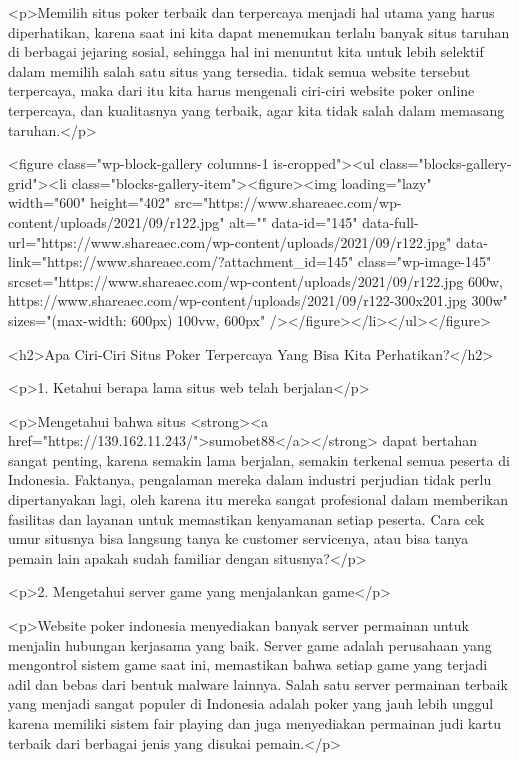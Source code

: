 <p>Memilih situs poker terbaik dan terpercaya menjadi hal utama yang harus diperhatikan, karena saat ini kita dapat menemukan terlalu banyak situs taruhan di berbagai jejaring sosial, sehingga hal ini menuntut kita untuk lebih selektif dalam memilih salah satu situs yang tersedia. tidak semua website tersebut terpercaya, maka dari itu kita harus mengenali ciri-ciri website poker online terpercaya, dan kualitasnya yang terbaik, agar kita tidak salah dalam memasang taruhan.</p>



<figure class="wp-block-gallery columns-1 is-cropped"><ul class="blocks-gallery-grid"><li class="blocks-gallery-item"><figure><img loading="lazy" width="600" height="402" src="https://www.shareaec.com/wp-content/uploads/2021/09/r122.jpg" alt="" data-id="145" data-full-url="https://www.shareaec.com/wp-content/uploads/2021/09/r122.jpg" data-link="https://www.shareaec.com/?attachment_id=145" class="wp-image-145" srcset="https://www.shareaec.com/wp-content/uploads/2021/09/r122.jpg 600w, https://www.shareaec.com/wp-content/uploads/2021/09/r122-300x201.jpg 300w" sizes="(max-width: 600px) 100vw, 600px" /></figure></li></ul></figure>



<h2>Apa Ciri-Ciri Situs Poker Terpercaya Yang Bisa Kita Perhatikan?</h2>



<p>1. Ketahui berapa lama situs web telah berjalan</p>



<p>Mengetahui bahwa situs <strong><a href="https://139.162.11.243/">sumobet88</a></strong> dapat bertahan sangat penting, karena semakin lama berjalan, semakin terkenal semua peserta di Indonesia. Faktanya, pengalaman mereka dalam industri perjudian tidak perlu dipertanyakan lagi, oleh karena itu mereka sangat profesional dalam memberikan fasilitas dan layanan untuk memastikan kenyamanan setiap peserta. Cara cek umur situsnya bisa langsung tanya ke customer servicenya, atau bisa tanya pemain lain apakah sudah familiar dengan situsnya?</p>



<p>2. Mengetahui server game yang menjalankan game</p>



<p>Website poker indonesia menyediakan banyak server permainan untuk menjalin hubungan kerjasama yang baik. Server game adalah perusahaan yang mengontrol sistem game saat ini, memastikan bahwa setiap game yang terjadi adil dan bebas dari bentuk malware lainnya. Salah satu server permainan terbaik yang menjadi sangat populer di Indonesia adalah poker yang jauh lebih unggul karena memiliki sistem fair playing dan juga menyediakan permainan judi kartu terbaik dari berbagai jenis yang disukai pemain.</p>



